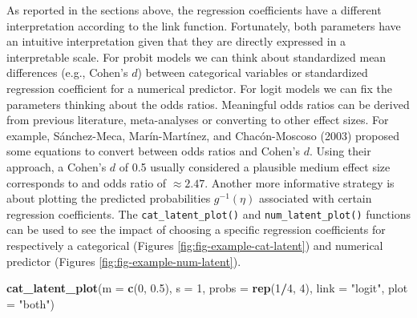 \documentclass[
  man,floatsintext]{apa6}
\newenvironment{Shaded}{\begin{snugshade}}{\end{snugshade}}
\newcommand{\AttributeTok}[1]{\textcolor[rgb]{0.13,0.29,0.53}{#1}}
\newcommand{\DecValTok}[1]{\textcolor[rgb]{0.00,0.00,0.81}{#1}}
\newcommand{\FloatTok}[1]{\textcolor[rgb]{0.00,0.00,0.81}{#1}}
\newcommand{\FunctionTok}[1]{\textcolor[rgb]{0.13,0.29,0.53}{\textbf{#1}}}
\newcommand{\NormalTok}[1]{#1}
\newcommand{\SpecialCharTok}[1]{\textcolor[rgb]{0.81,0.36,0.00}{\textbf{#1}}}
\newcommand{\StringTok}[1]{\textcolor[rgb]{0.31,0.60,0.02}{#1}}
\begin{document}
As reported in the sections above, the regression coefficients have a different interpretation according to the link function. Fortunately, both parameters have an intuitive interpretation given that they are directly expressed in a interpretable scale. For probit models we can think about standardized mean differences (e.g., Cohen's \(d\)) between categorical variables or standardized regression coefficient for a numerical predictor. For logit models we can fix the parameters thinking about the odds ratios. Meaningful odds ratios can be derived from previous literature, meta-analyses or converting to other effect sizes. For example, Sánchez-Meca, Marín-Martínez, and Chacón-Moscoso (2003) proposed some equations to convert between odds ratios and Cohen's \(d\). Using their approach, a Cohen's \(d\) of 0.5 usually considered a plausible medium effect size corresponds to and odds ratio of \(\approx 2.47\). Another more informative strategy is about plotting the predicted probabilities \(g^{-1}(\eta)\) associated with certain regression coefficients. The \texttt{cat\_latent\_plot()} and \texttt{num\_latent\_plot()} functions can be used to see the impact of choosing a specific regression coefficients for respectively a categorical (Figures \ref{fig:fig-example-cat-latent}) and numerical predictor (Figures \ref{fig:fig-example-num-latent}).

\scriptsize

\begin{Shaded}
\begin{Highlighting}[]
\FunctionTok{cat\_latent\_plot}\NormalTok{(}\AttributeTok{m =} \FunctionTok{c}\NormalTok{(}\DecValTok{0}\NormalTok{, }\FloatTok{0.5}\NormalTok{), }\AttributeTok{s =} \DecValTok{1}\NormalTok{, }\AttributeTok{probs =} \FunctionTok{rep}\NormalTok{(}\DecValTok{1}\SpecialCharTok{/}\DecValTok{4}\NormalTok{, }\DecValTok{4}\NormalTok{), }\AttributeTok{link =} \StringTok{"logit"}\NormalTok{, }\AttributeTok{plot =} \StringTok{"both"}\NormalTok{)}
\end{Highlighting}
\end{Shaded}
\end{document}
